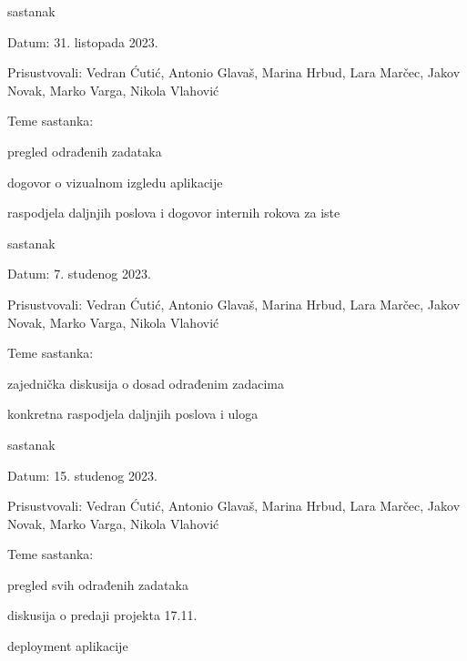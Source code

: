 \begin{packed_enum}
			\item  sastanak
			\item[] \begin{packed_item}
				\item Datum: 31. listopada 2023.
				\item Prisustvovali: Vedran Ćutić, Antonio Glavaš, Marina Hrbud, Lara Marčec, Jakov Novak, Marko Varga, Nikola Vlahović
				\item Teme sastanka:
				\begin{packed_item}
					\item  pregled odrađenih zadataka
					\item  dogovor o vizualnom izgledu aplikacije
					\item  raspodjela daljnjih poslova i dogovor internih rokova za iste
				\end{packed_item}
			\end{packed_item}
			
			\item  sastanak
			\item[] \begin{packed_item}
				\item Datum: 7. studenog 2023.
				\item Prisustvovali: Vedran Ćutić, Antonio Glavaš, Marina Hrbud, Lara Marčec, Jakov Novak, Marko Varga, Nikola Vlahović
				\item Teme sastanka:
				\begin{packed_item}
					\item  zajednička diskusija o dosad odrađenim zadacima
					\item  konkretna raspodjela daljnjih poslova i uloga
				\end{packed_item}
			\end{packed_item}


   			\item  sastanak
			\item[] \begin{packed_item}
				\item Datum: 15. studenog 2023.
				\item Prisustvovali: Vedran Ćutić, Antonio Glavaš, Marina Hrbud, Lara Marčec, Jakov Novak, Marko Varga, Nikola Vlahović
				\item Teme sastanka:
				\begin{packed_item}
					\item  pregled svih odrađenih zadataka
					\item  diskusija o predaji projekta 17.11.
     					\item  deployment aplikacije
				\end{packed_item}
			\end{packed_item}
			

\end{packed_enum}
